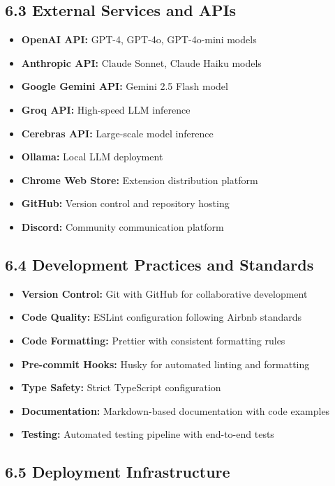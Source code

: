 \documentclass[12pt,a4paper]{article}
\begin{document}
\subsection*{\textbf{6.3 External Services and APIs}}

\begin{itemize}
    \item \textbf{OpenAI API:} GPT-4, GPT-4o, GPT-4o-mini models
    \item \textbf{Anthropic API:} Claude Sonnet, Claude Haiku models
    \item \textbf{Google Gemini API:} Gemini 2.5 Flash model
    \item \textbf{Groq API:} High-speed LLM inference
    \item \textbf{Cerebras API:} Large-scale model inference
    \item \textbf{Ollama:} Local LLM deployment
    \item \textbf{Chrome Web Store:} Extension distribution platform
    \item \textbf{GitHub:} Version control and repository hosting
    \item \textbf{Discord:} Community communication platform
\end{itemize}

\subsection*{\textbf{6.4 Development Practices and Standards}}

\begin{itemize}
    \item \textbf{Version Control:} Git with GitHub for collaborative development
    \item \textbf{Code Quality:} ESLint configuration following Airbnb standards
    \item \textbf{Code Formatting:} Prettier with consistent formatting rules
    \item \textbf{Pre-commit Hooks:} Husky for automated linting and formatting
    \item \textbf{Type Safety:} Strict TypeScript configuration
    \item \textbf{Documentation:} Markdown-based documentation with code examples
    \item \textbf{Testing:} Automated testing pipeline with end-to-end tests
\end{itemize}

\subsection*{\textbf{6.5 Deployment Infrastructure}}
\end{document}
